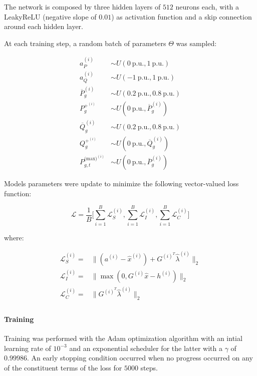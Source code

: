 \documentclass[
]{article}
\let\oldparagraph\paragraph
\renewcommand{\paragraph}[1]{\oldparagraph{#1}\mbox{}}
\begin{document}
The network is composed by three hidden layers of \(512\) neurons each,
with a LeakyReLU (negative slope of \(0.01\)) as activation function and
a skip connection around each hidden layer.

At each training step, a random batch of parameters \(\Theta\) was
sampled:

\begin{align}
a_P^{(i)} &\sim U(0~\mathrm{p.u}., 1~\mathrm{p.u.})\\
a_Q^{(i)} &\sim U(-1~\mathrm{p.u}., 1~\mathrm{p.u.})\\
\overline{P}_g^{(i)} &\sim U(0.2~\mathrm{p.u}., 0.8~\mathrm{p.u.})\\
P_g^{+^{(i)}} &\sim U(0~\mathrm{p.u}., \overline{P}_g^{(i)})\\
\overline{Q}_g^{(i)} &\sim U(0.2~\mathrm{p.u}., 0.8~\mathrm{p.u.})\\
Q_g^{+^{(i)}} &\sim U(0~\mathrm{p.u}., \overline{Q}_g^{(i)})\\
P^{\textrm{(max)}^{(i)}}_{g,t} &\sim U(0~\mathrm{p.u}., \overline{P}_g^{(i)})
\end{align}

Models parameters were update to minimize the following vector-valued
loss function:

\begin{equation}
\mathcal{L} = \frac{1}{B}\biggr[\sum_{i=1}^B\mathcal{L}_{S}^{(i)}, \sum_{i=1}^B\mathcal{L}_{I}^{(i)}, \sum_{i=1}^B\mathcal{L}_{C}^{(i)}\biggr] 
\end{equation}

where:

\begin{align}
    \mathcal{L}_S^{(i)} =& \|(a^{(i)}-\hat{x}^{(i)}) + G^{(i)^{T}}\hat\lambda^{(i)}\|_2\\ 
    \mathcal{L}_{I}^{(i)}  =& \|\max(0, G^{(i)}\hat{x} - h^{(i)})\|_2\\
    \mathcal{L}_{C}^{(i)}  =& \|G^{(i)^{T}}\hat\lambda^{(i)}\|_2\\
\end{align}

\paragraph{Training}\label{training-2}

Training was performed with the Adam optimization algorithm with an
intial learning rate of \(10^{-3}\) and an exponential scheduler for the
latter with a \(\gamma\) of \(0.99986\). An early stopping condition
occurred when no progress occurred on any of the constituent terms of
the loss for \(5000\) steps.
\end{document}
